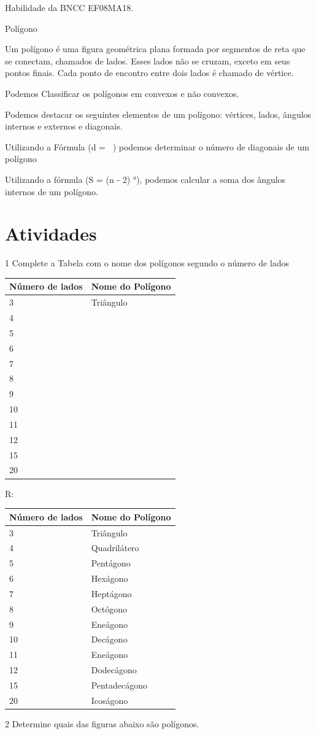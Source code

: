 {Habilidade da BNCC EF08MA18.

Polígono

Um polígono é uma figura geométrica plana formada por segmentos de reta
que se conectam, chamados de lados. Esses lados não se cruzam, exceto em
seus pontos finais. Cada ponto de encontro entre dois lados é chamado de
vértice.

Podemos Classificar os polígonos em convexos e não convexos.

Podemos destacar os seguintes elementos de um polígono: vértices, lados,
ângulos internos e externos e diagonais.

Utilizando a Fórmula (d = \ ) podemos determinar o
número de diagonais de um polígono

Utilizando a fórmula (S = (n - 2) °), podemos calcular a
soma dos ângulos internos de um polígono.

\section{Atividades}

\num{1} Complete a Tabela com o nome dos polígonos segundo o número de lados


\begin{longtable}[]{@{}ll@{}}
\toprule
Número de lados & Nome do Polígono\tabularnewline
\midrule
\endhead
3 & Triângulo\tabularnewline
4 & ~\tabularnewline
5 & ~\tabularnewline
6 & ~\tabularnewline
7 & ~\tabularnewline
8 & ~\tabularnewline
9 & ~\tabularnewline
10 & ~\tabularnewline
11 & ~\tabularnewline
12 & ~\tabularnewline
15 & ~\tabularnewline
20 & ~\tabularnewline
\bottomrule
\end{longtable}

R:

\begin{longtable}[]{@{}ll@{}}
\toprule
Número de lados & Nome do Polígono\tabularnewline
\midrule
\endhead
3 & Triângulo\tabularnewline
4 & Quadrilátero\tabularnewline
5 & Pentágono\tabularnewline
6 & Hexágono\tabularnewline
7 & Heptágono\tabularnewline
8 & Octógono\tabularnewline
9 & Eneágono\tabularnewline
10 & Decágono\tabularnewline
11 & Eneágono\tabularnewline
12 & Dodecágono\tabularnewline
15 & Pentadecágono\tabularnewline
20 & Icoságono\tabularnewline
\bottomrule
\end{longtable}

\num{2} Determine quais das figuras abaixo são polígonos.

}
